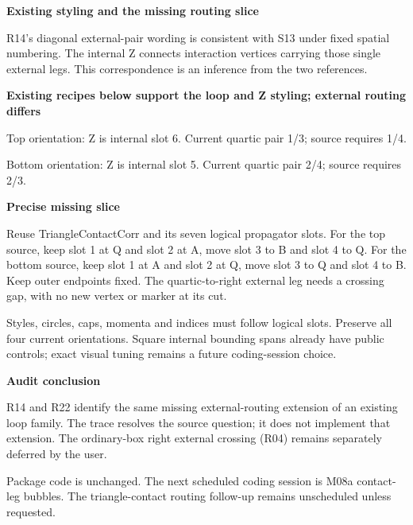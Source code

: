\documentclass[10pt,letterpaper]{article}
\newcommand{\heading}[2]{{\sffamily\bfseries\Large #1}\par\medskip #2\par\bigskip}
\newcommand{\styled}[2]{\TriangleContactCorr[field={},central={},show-momenta=false,
 leg-labels={q_1,q_2,q_3,q_4},triangle-contact-orientation=#1,
 triangle-contact-xspan=1.1,triangle-contact-yspan=1.1,
 triangle-contact-external-line=ewboson,triangle-contact-internal-lines={#2}]}
\begin{document}
\newpage
\heading{Existing styling and the missing routing slice}{R14's diagonal external-pair wording is consistent with S13 under fixed spatial numbering. The internal Z connects interaction vertices carrying those single external legs. This correspondence is an inference from the two references.}
\textbf{Existing recipes below support the loop and Z styling; external routing differs}\par\medskip
\begin{minipage}{.48\linewidth}\centering\styled{top}{ewboson,{ewboson,circ=Z},ewboson}\par\small Top orientation: Z is internal slot 6. Current quartic pair 1/3; source requires 1/4.\end{minipage}\hfill
\begin{minipage}{.48\linewidth}\centering\styled{bottom}{{ewboson,circ=Z},ewboson,ewboson}\par\small Bottom orientation: Z is internal slot 5. Current quartic pair 2/4; source requires 2/3.\end{minipage}
\par\bigskip\textbf{Precise missing slice}\par\medskip
Reuse TriangleContactCorr and its seven logical propagator slots. For the top source, keep slot 1 at Q and slot 2 at A, move slot 3 to B and slot 4 to Q. For the bottom source, keep slot 1 at A and slot 2 at Q, move slot 3 to Q and slot 4 to B. Keep outer endpoints fixed. The quartic-to-right external leg needs a crossing gap, with no new vertex or marker at its cut.
\par\medskip
Styles, circles, caps, momenta and indices must follow logical slots. Preserve all four current orientations. Square internal bounding spans already have public controls; exact visual tuning remains a future coding-session choice.
\par\bigskip\textbf{Audit conclusion}\par\medskip
R14 and R22 identify the same missing external-routing extension of an existing loop family. The trace resolves the source question; it does not implement that extension. The ordinary-box right external crossing (R04) remains separately deferred by the user.
\par\medskip
Package code is unchanged. The next scheduled coding session is M08a contact-leg bubbles. The triangle-contact routing follow-up remains unscheduled unless requested.
\end{document}
